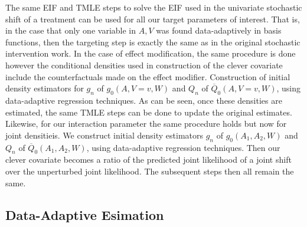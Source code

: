 \documentclass[
]{article}
\begin{document}
The same EIF and TMLE steps to solve the EIF used in the univariate
stochastic shift of a treatment can be used for all our target
parameters of interest. That is, in the case that only one variable in
\(A,V\) was found data-adaptively in basis functions, then the targeting
step is exactly the same as in the original stochastic intervention
work. In the case of effect modification, the same procedure is done
however the conditional densities used in construction of the clever
covariate include the counterfactuals made on the effect modifier.
Construction of initial density estimators for \(g_n\) of
\(g_0(A, V=v, W)\) and \(Q_n\) of \(\overline{Q}_0(A, V=v, W)\), using
data-adaptive regression techniques. As can be seen, once these
densities are estimated, the same TMLE steps can be done to update the
original estimates. Likewise, for our interaction parameter the same
procedure holds but now for joint densitieis. We construct initial
density estimators \(g_n\) of \(g_0(A_1, A_2, W)\) and \(Q_n\) of
\(\overline{Q}_0(A_1, A_2, W)\), using data-adaptive regression
techniques. Then our clever covariate becomes a ratio of the predicted
joint likelihood of a joint shift over the unperturbed joint likelihood.
The subsequent steps then all remain the same.

\hypertarget{data-adaptive-esimation}{%
\subsection{Data-Adaptive Esimation}\label{data-adaptive-esimation}}
\end{document}
